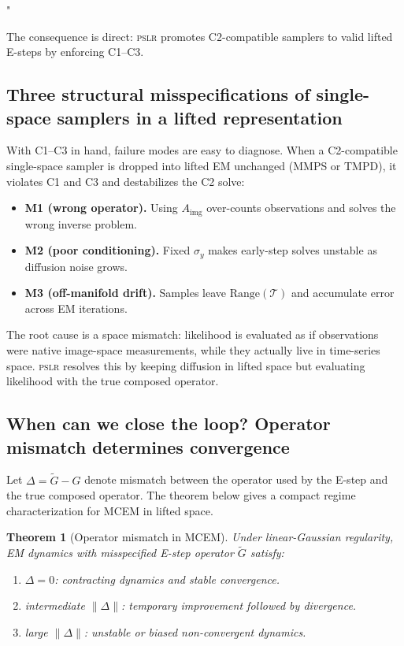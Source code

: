"\documentclass{article}
\theoremstyle{plain}
\newtheorem{theorem}{Theorem}[section]
\theoremstyle{definition}
\theoremstyle{remark}
\newcommand{\tsimg}{\mathcal{T}}
\newcommand{\pslr}{\textsc{pslr}}
\newcommand{\Aimg}{A_{\mathrm{img}}}
\begin{document}
The consequence is direct: \pslr{} promotes C2-compatible samplers to valid lifted E-steps by enforcing C1--C3.

\vspace{-1mm}
\subsection{Three structural misspecifications of single-space samplers in a lifted representation}
\label{subsec:misspec}
\vspace{-1mm}

With C1--C3 in hand, failure modes are easy to diagnose. When a C2-compatible single-space sampler is dropped into lifted EM unchanged (MMPS or TMPD), it violates C1 and C3 and destabilizes the C2 solve:
\begin{itemize}
\setlength{\itemsep}{0pt}
\item \textbf{M1 (wrong operator).} Using $\Aimg$ over-counts observations and solves the wrong inverse problem.
\item \textbf{M2 (poor conditioning).} Fixed $\sigma_y$ makes early-step solves unstable as diffusion noise grows.
\item \textbf{M3 (off-manifold drift).} Samples leave $\mathrm{Range}(\tsimg)$ and accumulate error across EM iterations.
\end{itemize}
The root cause is a space mismatch: likelihood is evaluated as if observations were native image-space measurements, while they actually live in time-series space. \pslr{} resolves this by keeping diffusion in lifted space but evaluating likelihood with the true composed operator.

\vspace{-1mm}
\subsection{When can we close the loop? Operator mismatch determines convergence}
\label{subsec:theorem}
\vspace{-1mm}

Let $\Delta=\tilde{G}-G$ denote mismatch between the operator used by the E-step and the true composed operator. The theorem below gives a compact regime characterization for MCEM in lifted space.

\begin{theorem}[Operator mismatch in MCEM]
\label{thm:operator-mismatch}
Under linear-Gaussian regularity, EM dynamics with misspecified E-step operator $\tilde{G}$ satisfy:
\begin{enumerate}
\setlength{\itemsep}{0pt}
\item[(a)] $\Delta=0$: contracting dynamics and stable convergence.
\item[(b)] intermediate $\|\Delta\|$: temporary improvement followed by divergence.
\item[(c)] large $\|\Delta\|$: unstable or biased non-convergent dynamics.
\end{enumerate}
\end{theorem}
\end{document}

